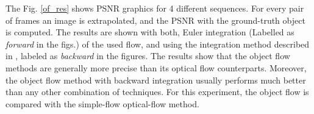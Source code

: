 The Fig. \ref{of_res} shows PSNR graphics for 4 different sequences. For every pair of frames an image is extrapolated, and the PSNR with the ground-truth object is computed.
The results are shown with both, Euler integration (Labelled as {\it forward} in the figs.) of the used flow, 
and using the integration method described in \cite{c20}, labeled as {\it backward} in the figures. The results show that the object flow methods are generally more precise than its optical flow 
counterparts. Moreover, the object flow method with backward integration usually performs much better than any other combination of techniques. For this experiment, the object flow is compared with the simple-flow optical-flow method.


